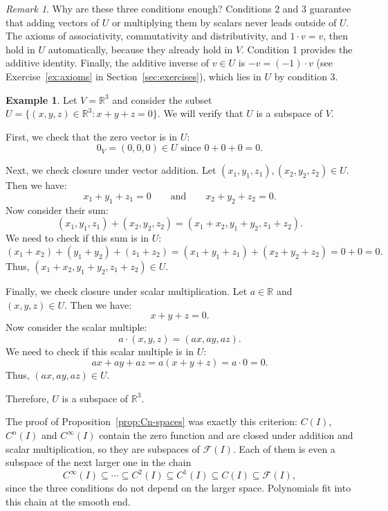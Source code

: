 \documentclass[11pt]{article}
\theoremstyle{definition}
\newtheorem{example}[definition]{Example}
\theoremstyle{plain}
\theoremstyle{remark}
\newtheorem{remark}[definition]{Remark}
\begin{document}
\begin{remark}
    Why are these three conditions enough? Conditions 2 and 3 guarantee that adding vectors of $U$ or multiplying them by scalars never leads outside of $U$. The axioms of associativity, commutativity and distributivity, and $1 \cdot v = v$, then hold in $U$ automatically, because they already hold in $V$. Condition 1 provides the additive identity. Finally, the additive inverse of $v \in U$ is $-v = (-1) \cdot v$ (see Exercise~\ref{ex:axioms} in Section~\ref{sec:exercises}), which lies in $U$ by condition 3.
\end{remark}

\begin{example}
    Let $V = \mathbb{R}^3$ and consider the subset $U = \{(x, y, z) \in \mathbb{R}^3 : x + y + z = 0\}$. We will verify that $U$ is a subspace of $V$.

    First, we check that the zero vector is in $U$:
    \[0_V = (0, 0, 0) \in U \text{ since } 0 + 0 + 0 = 0.\]

    Next, we check closure under vector addition. Let $(x_1, y_1, z_1), (x_2, y_2, z_2) \in U$. Then we have:
    \[x_1 + y_1 + z_1 = 0 \qquad \text{and} \qquad x_2 + y_2 + z_2 = 0.\]
    Now consider their sum:
    \[(x_1, y_1, z_1) + (x_2, y_2, z_2) = (x_1 + x_2, y_1 + y_2, z_1 + z_2).\]
    We need to check if this sum is in $U$:
    \[(x_1 + x_2) + (y_1 + y_2) + (z_1 + z_2) = (x_1 + y_1 + z_1) + (x_2 + y_2 + z_2) = 0 + 0 = 0.\]
    Thus, $(x_1 + x_2, y_1 + y_2, z_1 + z_2) \in U$.

    Finally, we check closure under scalar multiplication. Let $a \in \mathbb{R}$ and $(x, y, z) \in U$. Then we have:
    \[x + y + z = 0.\]
    Now consider the scalar multiple:
    \[a \cdot (x, y, z) = (ax, ay, az).\]
    We need to check if this scalar multiple is in $U$:
    \[ax + ay + az = a(x + y + z) = a \cdot 0 = 0.\]
    Thus, $(ax, ay, az) \in U$.

    Therefore, $U$ is a subspace of $\mathbb{R}^3$.
\end{example}

The proof of Proposition~\ref{prop:Cn-spaces} was exactly this criterion: $C(I)$, $C^n(I)$ and $C^\infty(I)$ contain the zero function and are closed under addition and scalar multiplication, so they are subspaces of $\mathcal{F}(I)$. Each of them is even a subspace of the next larger one in the chain
\[C^\infty(I) \subseteq \cdots \subseteq C^2(I) \subseteq C^1(I) \subseteq C(I) \subseteq \mathcal{F}(I),\]
since the three conditions do not depend on the larger space. Polynomials fit into this chain at the smooth end.
\end{document}
